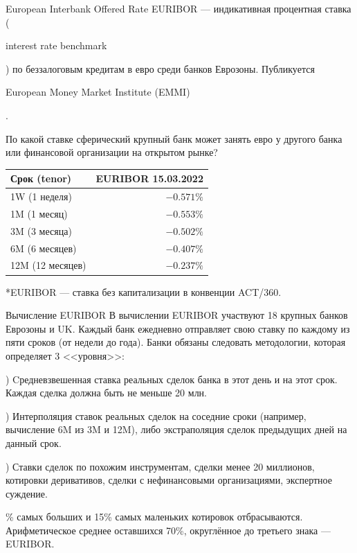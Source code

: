 \documentclass{beamer}
\newcommand{\en}[1]{\begin{otherlanguage}{english}#1\end{otherlanguage}}
\begin{document}
\begin{frame}{European Interbank Offered Rate}
\justify
\alert{EURIBOR} --- индикативная процентная ставка (\en{interest rate benchmark}) по беззалоговым кредитам в евро среди банков Еврозоны. Публикуется \en{European Money Market Institute (EMMI)}.

\justify
По какой ставке сферический крупный банк может занять евро у другого банка или финансовой организации на открытом рынке? 

\justify
\centering
\begin{tabular}{l|r}
Срок (tenor)     & EURIBOR 15.03.2022 \\ \hline
1W (1 неделя)    & $-0.571\%$ \\
1M (1 месяц)     & $-0.553\%$ \\
3M (3 месяца)    & $-0.502\%$ \\
6M (6 месяцев)   & $-0.407\%$ \\
12M (12 месяцев) & $-0.237\%$ 
\end{tabular}

\justify
*EURIBOR --- ставка без капитализации в конвенции ACT/360.
\end{frame}



\begin{frame}{Вычисление EURIBOR}
\justify
В вычислении EURIBOR участвуют 18 крупных банков Еврозоны и UK. Каждый банк ежедневно отправляет свою ставку по каждому из пяти сроков (от недели до года). Банки обязаны следовать методологии, которая определяет 3 <<уровня>>:

) Cредневзвешенная ставка реальных сделок банка в этот день и на этот срок. Каждая сделка должна быть не меньше 20 млн.

) Интерполяция ставок реальных сделок на соседние сроки (например, вычисление 6M из 3M и 12M), либо экстраполяция сделок предыдущих дней на данный срок.

) Ставки сделок по похожим инструментам, сделки менее 20 миллионов, котировки деривативов, сделки с нефинансовыми организациями, экспертное суждение. 

\% самых больших и 15\% самых маленьких котировок отбрасываются. Арифметическое среднее оставшихся 70\%, округлённое до третьего знака --- EURIBOR.
\end{frame}
\end{document}
